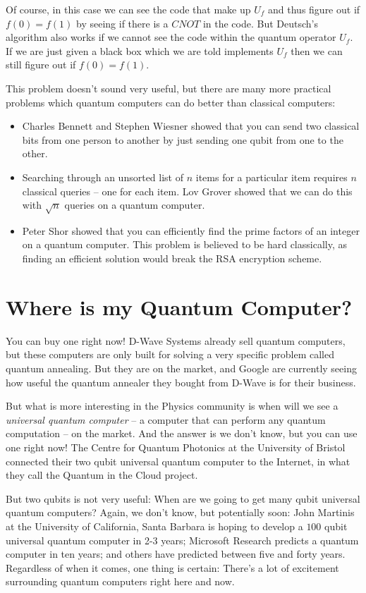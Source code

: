 \documentclass[twocolumn]{article}
\begin{document}
Of course, in this case we can see the code that make up $U_f$ and thus figure out if $f(0) = f(1)$ by seeing if there is a $CNOT$ in the code. But Deutsch's algorithm also works if we cannot see the code within the quantum operator $U_f$. If we are just given a black box which we are told implements $U_f$ then we can still figure out if $f(0) = f(1)$.

This problem doesn't sound very useful, but there are many more practical problems which quantum computers can do better than classical computers:

\begin{itemize}
\item Charles Bennett and Stephen Wiesner showed that you can send two classical bits from one person to another by just sending one qubit from one to the other.
\item Searching through an unsorted list of $n$ items for a particular item requires $n$ classical queries -- one for each item. Lov Grover showed that we can do this with $\sqrt{n}$ queries on a quantum computer.
\item Peter Shor showed that you can efficiently find the prime factors of an integer on a quantum computer. This problem is believed to be hard classically, as finding an efficient solution would break the RSA encryption scheme.
\end{itemize}

\section{Where is my Quantum Computer?}

You can buy one right now! D-Wave Systems already sell quantum computers, but these computers are only built for solving a very specific problem called quantum annealing. But they are on the market, and Google are currently seeing how useful the quantum annealer they bought from D-Wave is for their business.

But what is more interesting in the Physics community is when will we see a {\em universal quantum computer} -- a computer that can perform any quantum computation -- on the market. And the answer is we don't know, but you can use one right now! The Centre for Quantum Photonics at the University of Bristol connected their two qubit universal quantum computer to the Internet, in what they call the Quantum in the Cloud project.

But two qubits is not very useful: When are we going to get many qubit universal quantum computers? Again, we don't know, but potentially soon: John Martinis at the University of California, Santa Barbara is hoping to develop a $100$ qubit universal quantum computer in 2-3 years; Microsoft Research predicts a quantum computer in ten years; and others have predicted between five and forty years. Regardless of when it comes, one thing is certain: There's a lot of excitement surrounding quantum computers right here and now.
\end{document}
